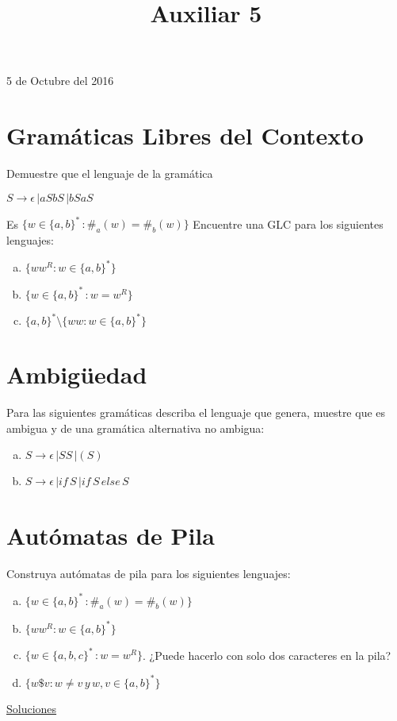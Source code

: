 \documentclass[dcc]{fcfmcourse}
\title{Auxiliar 5}
\begin{document}
\maketitle
\begin{center}
5 de Octubre del 2016
\end{center}
\vspace{-1ex}

\section*{Gramáticas Libres del Contexto}
\begin{problems}
\problem Demuestre que el lenguaje de la gramática 
\begin{center}
$S \rightarrow \epsilon\, | aSbS\,| bSaS$
\end{center}
Es $\{w \in \{a,b\}^*\,\colon \#_{a}(w)=\#_{b}(w)\}$
\problem Encuentre una GLC para los siguientes lenguajes:
\begin{enumerate}[a)]
    \item $\{ww^R\colon w \in\{a,b\}^*\}$
    \item $\{w \in \{a,b\}^*\,\colon w=w^R\}$
    \item $\{a,b\}^* \setminus \{ww\colon w \in\{a,b\}^*\}$
\end{enumerate}
\end{problems}

\section*{Ambigüedad}
\begin{problems}
\problem Para las siguientes gramáticas describa el lenguaje que genera, muestre que es ambigua y de una gramática alternativa no ambigua:

\begin{enumerate}[a)]
    \item $S \rightarrow \epsilon\, | SS\,| (S)$
    \item $S \rightarrow \epsilon\, | if\, S\,| if\, S\, else\, S$
\end{enumerate}
\end{problems}

\section*{Autómatas de Pila}
\begin{problems}
\problem Construya autómatas de pila para los siguientes lenguajes:
\begin{enumerate}[a)]
    \item $\{w \in \{a,b\}^*\,\colon \#_{a}(w)=\#_{b}(w)\}$
    \item $\{ww^R\colon w \in\{a,b\}^*\}$
    \item $\{w \in \{a,b,c\}^*\,\colon w=w^R\}$. ¿Puede hacerlo con solo dos caracteres en la pila?
    \item $\{w\$v\colon w\not = v\, y \, w,v \in\{a,b\}^*\}$
\end{enumerate}
\end{problems}
\newpage
\begin{center}
{\huge \underline{Soluciones}}
\end{center}
\end{document}
